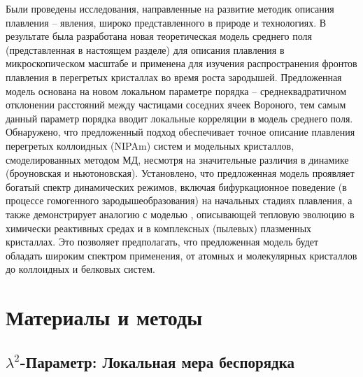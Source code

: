 Были проведены исследования, направленные на развитие методик описания плавления -- явления, широко представленного в природе и технологиях. В результате была разработана новая теоретическая модель среднего поля (представленная в настоящем разделе) для описания плавления в микроскопическом масштабе и применена для изучения распространения фронтов плавления в перегретых кристаллах во время роста зародышей.
Предложенная модель основана на новом локальном параметре порядка -- среднеквадратичном отклонении расстояний между частицами соседних ячеек Вороного, тем самым данный параметр порядка вводит локальные корреляции в модель среднего поля.
Обнаружено, что предложенный подход обеспечивает точное описание плавления перегретых коллоидных (NIPAm) систем и модельных кристаллов, смоделированных методом МД, несмотря на значительные различия в динамике (броуновская и ньютоновская).
Установлено, что предложенная модель проявляет богатый спектр динамических режимов, включая бифуркационное поведение (в процессе гомогенного зародышеобразования) на начальных стадиях плавления, а также демонстрирует аналогию с моделью \cite{10.1103/physreve.96.043201, 10.1103/physreve.100.023203}, описывающей тепловую эволюцию в химически реактивных средах и в комплексных (пылевых) плазменных кристаллах.
Это позволяет предполагать, что предложенная модель будет обладать широким спектром применения, от атомных и молекулярных кристаллов до коллоидных и белковых систем.

\section{Материалы и методы}

\subsection{$\lambda^2$-Параметр: Локальная мера беспорядка}
\label{SSMF-AppA}

